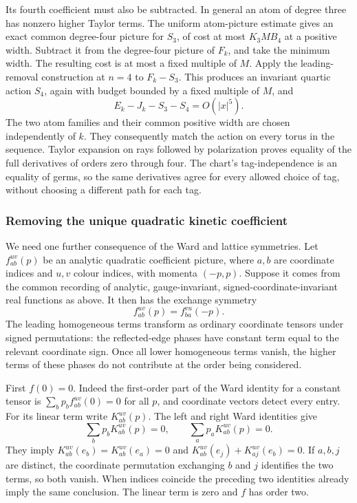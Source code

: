 Its fourth coefficient must also be subtracted. In general an
atom of degree three has nonzero higher Taylor terms. The uniform
atom-picture estimate gives an exact common degree-four picture
for $S_3$, of cost at most $K_3M B_4$ at a positive width. Subtract
it from the degree-four picture of $F_k$, and take the minimum
width. The resulting cost is at most a fixed multiple of $M$.
Apply the leading-removal construction at $n=4$ to $F_k-S_3$.
This produces an invariant quartic action $S_4$, again with budget
bounded by a fixed multiple of $M$, and
\begin{equation}\label{eq:output-classical-five}
                     E_k-J_k-S_3-S_4=O(|x|^5).
\end{equation}
The two atom families and their common positive width are chosen
independently of $k$. They consequently match the action on every
torus in the sequence. Taylor expansion on rays followed by
polarization proves equality of the full derivatives of orders
zero through four. The chart's tag-independence is an equality
of germs, so the same derivatives agree for every allowed choice
of tag, without choosing a different path for each tag.

\subsubsection{Removing the unique quadratic kinetic coefficient}
We need one further consequence of the Ward and lattice symmetries.
Let $f_{ab}^{uv}(p)$ be an analytic quadratic coefficient picture,
where $a,b$ are coordinate indices and $u,v$ colour indices,
with momenta $(-p,p)$. Suppose it comes from the common recording
of analytic, gauge-invariant, signed-coordinate-invariant real
functions as above. It then has the exchange symmetry
\[
                  f_{ab}^{uv}(p)=f_{ba}^{vu}(-p).
\]
The leading homogeneous terms transform as ordinary coordinate
tensors under signed permutations: the reflected-edge phases have
constant term equal to the relevant coordinate sign. Once all
lower homogeneous terms vanish, the higher terms of these phases
do not contribute at the order being considered.

First $f(0)=0$. Indeed the first-order part of the Ward identity
for a constant tensor is $\sum_b p_b f_{ab}^{uv}(0)=0$ for all
$p$, and coordinate vectors detect every entry. For its linear
term write $K_{ab}^{uv}(p)$. The left and right Ward identities
give
\[
 \sum_b p_bK_{ab}^{uv}(p)=0,\qquad
 \sum_a p_aK_{ab}^{uv}(p)=0.
\]
They imply $K_{ab}^{uv}(e_b)=K_{ab}^{uv}(e_a)=0$ and
$K_{ab}^{uv}(e_j)+K_{aj}^{uv}(e_b)=0$. If $a,b,j$ are distinct,
the coordinate permutation exchanging $b$ and $j$ identifies the
two terms, so both vanish. When indices coincide the preceding
two identities already imply the same conclusion. The linear
term is zero and $f$ has order two.

